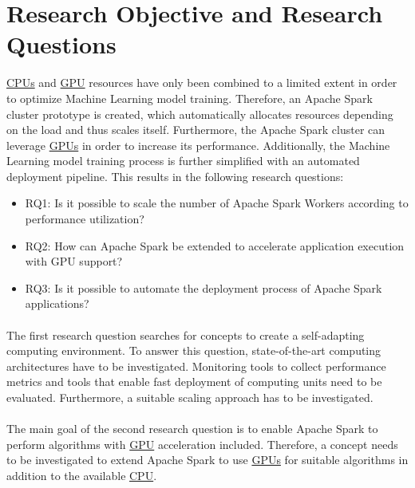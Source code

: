 \section{Research Objective and Research Questions}
\hyperlink{abbr:cpu}{CPUs} and \hyperlink{abbr:gpu}{GPU} resources have only been combined to a limited extent in order to optimize Machine Learning model training. Therefore, an Apache Spark cluster prototype is created, which automatically allocates resources depending on the load and thus scales itself. Furthermore, the Apache Spark cluster can leverage \hyperlink{abbr:gpu}{GPUs} in order to increase its performance.
Additionally, the Machine Learning model training process is further simplified with an automated deployment pipeline.
This results in the following research questions:
\begin{itemize}
\item RQ1: Is it possible to scale the number of Apache Spark Workers according to performance utilization?
\item RQ2: How can Apache Spark be extended to accelerate application execution with GPU support?
\item RQ3: Is it possible to automate the deployment process of Apache Spark applications?
\end{itemize}


\paragraph{}
The first research question searches for concepts to create a self-adapting computing environment.
To answer this question, state-of-the-art computing architectures have to be investigated.
Monitoring tools to collect performance metrics and tools that enable fast deployment of computing units need to be evaluated.
Furthermore, a suitable scaling approach has to be investigated.


\paragraph{}
The main goal of the second research question is to enable Apache Spark to perform algorithms with \hyperlink{abbr:gpu}{GPU} acceleration included.
Therefore, a concept needs to be investigated to extend Apache Spark to use \hyperlink{abbr:gpu}{GPUs} for suitable algorithms in addition to the available \hyperlink{abbr:cpu}{CPU}.


